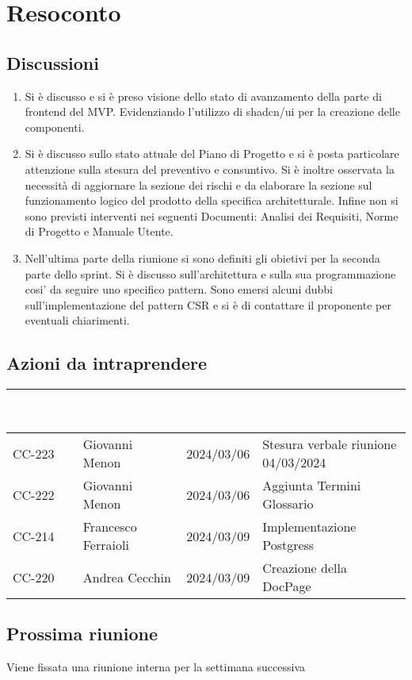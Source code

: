 \section{Resoconto} \label{sec:resoconto}
\subsection{Discussioni} \label{subsec:resdiscussione}
\begin{enumerate}
    \item Si è discusso e si è preso visione dello stato di avanzamento della parte di frontend del MVP. Evidenziando l'utilizzo di shadcn/ui per la creazione delle componenti.
    \item Si è discusso sullo stato attuale del Piano di Progetto e si è posta particolare attenzione sulla stesura del preventivo e consuntivo. Si è inoltre osservata la necessità di aggiornare la sezione dei rischi e da elaborare la sezione sul funzionamento logico del prodotto della specifica architetturale. Infine non si sono previsti interventi nei seguenti Documenti: Analisi dei Requisiti, Norme di Progetto e Manuale Utente.
    \item Nell'ultima parte della riunione si sono definiti gli obietivi per la seconda parte dello sprint. Si è  discusso sull'architettura e sulla sua programmazione cosi' da seguire uno specifico pattern. Sono emersi alcuni dubbi sull'implementazione del pattern CSR e si è di contattare il proponente per eventuali chiarimenti.
\end{enumerate}



\subsection{Azioni da intraprendere}
{
    \setlength{\tabcolsep}{10pt}
            \renewcommand{\arraystretch}{1.5}
            \begin{tabularx}{\textwidth}{| l | l | l | X |}
                 \hline
                 \rowcolor{headerrow}\textbf{\textcolor{white}{Codice issue}} & \textbf{\textcolor{white}{Assegnatario}} & \textbf{\textcolor{white}{Scadenza}} & \textbf{\textcolor{white}{Descrizione}} \\
                 \hline
                 CC-223 & Giovanni Menon &2024/03/06 & Stesura verbale riunione 04/03/2024  \\
                 \hline
                 CC-222 & Giovanni Menon &2024/03/06 & Aggiunta Termini Glossario  \\
                 \hline
                 CC-214 & Francesco Ferraioli &2024/03/09 & Implementazione Postgress  \\
                 \hline
                 CC-220 & Andrea Cecchin &2024/03/09 & Creazione della DocPage  \\
                 \hline
            \end{tabularx}
}


\subsection{Prossima riunione} \label{subsec:riunione}
Viene fissata una riunione interna per la settimana successiva